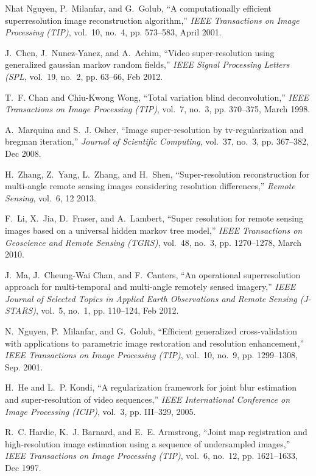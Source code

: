 \documentclass[journal]{IEEEtran}
\begin{document}
\begin{thebibliography}{10}
{Nhat Nguyen}, P.~{Milanfar}, and G.~{Golub}, ``A computationally efficient
  superresolution image reconstruction algorithm,'' \emph{IEEE Transactions on
  Image Processing (TIP)}, vol.~10, no.~4, pp. 573--583, April 2001.

J.~{Chen}, J.~{Nunez-Yanez}, and A.~{Achim}, ``Video super-resolution using
  generalized gaussian markov random fields,'' \emph{IEEE Signal Processing
  Letters (SPL}, vol.~19, no.~2, pp. 63--66, Feb 2012.

T.~F. {Chan} and {Chiu-Kwong Wong}, ``Total variation blind deconvolution,''
  \emph{IEEE Transactions on Image Processing (TIP)}, vol.~7, no.~3, pp.
  370--375, March 1998.

A.~Marquina and S.~J. Osher, ``Image super-resolution by tv-regularization and
  bregman iteration,'' \emph{Journal of Scientific Computing}, vol.~37, no.~3,
  pp. 367--382, Dec 2008.

H.~Zhang, Z.~Yang, L.~Zhang, and H.~Shen, ``Super-resolution reconstruction for
  multi-angle remote sensing images considering resolution differences,''
  \emph{Remote Sensing}, vol.~6, 12 2013.

F.~{Li}, X.~{Jia}, D.~{Fraser}, and A.~{Lambert}, ``Super resolution for remote
  sensing images based on a universal hidden markov tree model,'' \emph{IEEE
  Transactions on Geoscience and Remote Sensing (TGRS)}, vol.~48, no.~3, pp.
  1270--1278, March 2010.

J.~{Ma}, J.~{Cheung-Wai Chan}, and F.~{Canters}, ``An operational
  superresolution approach for multi-temporal and multi-angle remotely sensed
  imagery,'' \emph{IEEE Journal of Selected Topics in Applied Earth
  Observations and Remote Sensing (J-STARS)}, vol.~5, no.~1, pp. 110--124, Feb
  2012.

N.~{Nguyen}, P.~{Milanfar}, and G.~{Golub}, ``Efficient generalized
  cross-validation with applications to parametric image restoration and
  resolution enhancement,'' \emph{IEEE Transactions on Image Processing (TIP)},
  vol.~10, no.~9, pp. 1299--1308, Sep. 2001.

H.~He and L.~P. Kondi, ``A regularization framework for joint blur estimation
  and super-resolution of video sequences,'' \emph{IEEE International
  Conference on Image Processing (ICIP)}, vol.~3, pp. III--329, 2005.

R.~C. {Hardie}, K.~J. {Barnard}, and E.~E. {Armstrong}, ``Joint map
  registration and high-resolution image estimation using a sequence of
  undersampled images,'' \emph{IEEE Transactions on Image Processing (TIP)},
  vol.~6, no.~12, pp. 1621--1633, Dec 1997.


\end{thebibliography}
\end{document}
